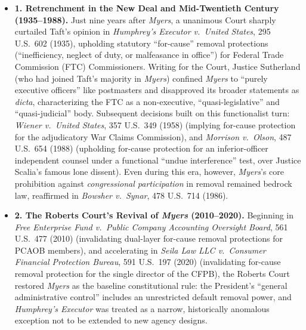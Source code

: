 \documentclass[12pt]{article}
\begin{document}
\begin{itemize}

\item \textbf{1. Retrenchment in the New Deal and Mid-Twentieth Century (1935--1988).}
Just nine years after \textit{Myers}, a unanimous Court sharply curtailed Taft's opinion in \textit{Humphrey's Executor v.\ United States}, 295 U.S.\ 602 (1935), upholding statutory ``for-cause'' removal protections (``inefficiency, neglect of duty, or malfeasance in office'') for Federal Trade Commission (FTC) Commissioners. Writing for the Court, Justice Sutherland (who had joined Taft's majority in \textit{Myers}) confined \textit{Myers} to ``purely executive officers'' like postmasters and disapproved its broader statements as \textit{dicta}, characterizing the FTC as a non-executive, ``quasi-legislative'' and ``quasi-judicial'' body. Subsequent decisions built on this functionalist turn: \textit{Wiener v.\ United States}, 357 U.S.\ 349 (1958) (implying for-cause protection for the adjudicatory War Claims Commission), and \textit{Morrison v.\ Olson}, 487 U.S.\ 654 (1988) (upholding for-cause protection for an inferior-officer independent counsel under a functional ``undue interference'' test, over Justice Scalia's famous lone dissent). Even during this era, however, \textit{Myers}'s core prohibition against \emph{congressional participation} in removal remained bedrock law, reaffirmed in \textit{Bowsher v.\ Synar}, 478 U.S.\ 714 (1986).

\item \textbf{2. The Roberts Court's Revival of \textit{Myers} (2010--2020).}
Beginning in \textit{Free Enterprise Fund v.\ Public Company Accounting Oversight Board}, 561 U.S.\ 477 (2010) (invalidating dual-layer for-cause removal protections for PCAOB members), and accelerating in \textit{Seila Law LLC v.\ Consumer Financial Protection Bureau}, 591 U.S.\ 197 (2020) (invalidating for-cause removal protection for the single director of the CFPB), the Roberts Court restored \textit{Myers} as the baseline constitutional rule: the President's ``general administrative control'' includes an unrestricted default removal power, and \textit{Humphrey's Executor} was treated as a narrow, historically anomalous exception not to be extended to new agency designs.


\end{itemize}
\end{document}
